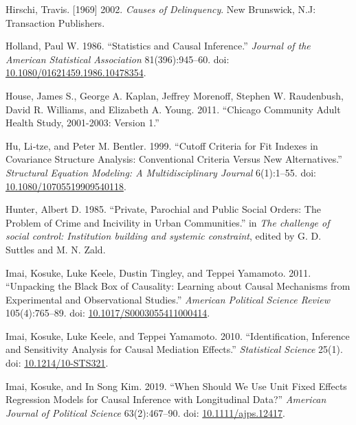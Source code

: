 \documentclass [11pt, proquest] {uwthesis}[2015/03/03]
\newlength{\cslhangindent}
\newenvironment{CSLReferences}[2]%
{\setlength{\parindent}{0pt}%
\everypar{\setlength{\hangindent}{\cslhangindent}}\ignorespaces}%
{\par}
\begin{document}
\begin{CSLReferences}{1}{0}
\leavevmode\hypertarget{ref-hirschiCausesDelinquency2002}{}%
Hirschi, Travis. {[}1969{]} 2002. \emph{Causes of {Delinquency}}. {New Brunswick, N.J}: {Transaction Publishers}.

\leavevmode\hypertarget{ref-hollandStatisticsCausalInference1986}{}%
Holland, Paul W. 1986. {``Statistics and {Causal Inference}.''} \emph{Journal of the American Statistical Association} 81(396):945--60. doi: \href{https://doi.org/10.1080/01621459.1986.10478354}{10.1080/01621459.1986.10478354}.

\leavevmode\hypertarget{ref-houseChicagoCommunityAdult2011}{}%
House, James S., George A. Kaplan, Jeffrey Morenoff, Stephen W. Raudenbush, David R. Williams, and Elizabeth A. Young. 2011. {``Chicago {Community Adult Health Study}, 2001-2003: {Version} 1.''}

\leavevmode\hypertarget{ref-huCutoffCriteriaFit1999}{}%
Hu, Li‐tze, and Peter M. Bentler. 1999. {``Cutoff Criteria for Fit Indexes in Covariance Structure Analysis: {Conventional} Criteria Versus New Alternatives.''} \emph{Structural Equation Modeling: A Multidisciplinary Journal} 6(1):1--55. doi: \href{https://doi.org/10.1080/10705519909540118}{10.1080/10705519909540118}.

\leavevmode\hypertarget{ref-d03d980337c440b9bca544e58a37d424}{}%
Hunter, Albert D. 1985. {``Private, Parochial and Public Social Orders: {The} Problem of Crime and Incivility in Urban Communities.''} in \emph{The challenge of social control: {Institution} building and systemic constraint}, edited by G. D. Suttles and M. N. Zald.

\leavevmode\hypertarget{ref-imaiUnpackingBlackBox2011}{}%
Imai, Kosuke, Luke Keele, Dustin Tingley, and Teppei Yamamoto. 2011. {``Unpacking the {Black Box} of {Causality}: {Learning} about {Causal Mechanisms} from {Experimental} and {Observational Studies}.''} \emph{American Political Science Review} 105(4):765--89. doi: \href{https://doi.org/10.1017/S0003055411000414}{10.1017/S0003055411000414}.

\leavevmode\hypertarget{ref-imaiIdentificationInferenceSensitivity2010}{}%
Imai, Kosuke, Luke Keele, and Teppei Yamamoto. 2010. {``Identification, {Inference} and {Sensitivity Analysis} for {Causal Mediation Effects}.''} \emph{Statistical Science} 25(1). doi: \href{https://doi.org/10.1214/10-STS321}{10.1214/10-STS321}.

\leavevmode\hypertarget{ref-imaiWhenShouldWe2019}{}%
Imai, Kosuke, and In Song Kim. 2019. {``When {Should We Use Unit Fixed Effects Regression Models} for {Causal Inference} with {Longitudinal Data}?''} \emph{American Journal of Political Science} 63(2):467--90. doi: \href{https://doi.org/10.1111/ajps.12417}{10.1111/ajps.12417}.


\end{CSLReferences}
\end{document}

